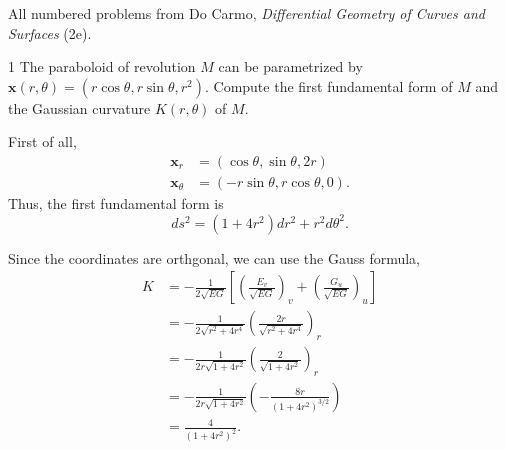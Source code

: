 \documentclass[11pt]{article}
\begin{document}
All numbered problems from Do Carmo, \textit{Differential Geometry of Curves and Surfaces} (2e).
\begin{problem}{1}
  The paraboloid of revolution \( M \) can be parametrized by \( \mathbf{x}(r,\theta) = (r\cos\theta, r\sin\theta, r^2) \).
  Compute the first fundamental form of \( M \) and the Gaussian curvature \( K(r,\theta) \) of \( M \).
\end{problem}
\begin{answer}
  First of all,
  \begin{equation}
  \label{eq:1}
  \begin{aligned}
    \mathbf{x}_r &= (\cos\theta, \sin\theta, 2r) \\
    \mathbf{x}_{\theta} &= (-r\sin\theta, r\cos\theta, 0).
  \end{aligned}
\end{equation}
Thus, the first fundamental form is
\begin{equation}
\label{eq:2}
ds^2 = (1+4r^2)dr^2 + r^2d\theta^2.
\end{equation}

Since the coordinates are orthgonal, we can use the Gauss formula,
\begin{equation}
\label{eq:3}
\begin{aligned}
  K &= - \frac{1}{2 \sqrt{EG}} \left[ \left( \frac{E_v}{\sqrt{EG}} \right)_v + \left( \frac{G_u}{\sqrt{EG}} \right)_u \right] \\
    &= - \frac{1}{2\sqrt{r^2 + 4r^4}} \left( \frac{2r}{\sqrt{r^2 + 4r^{4}}} \right)_{r} \\
    &= - \frac{1}{2r\sqrt{1+4r^2}} \left( \frac{2}{\sqrt{1+4r^2}} \right)_r \\
    &= - \frac{1}{2r\sqrt{1+4r^2}} \left( -\frac{8r}{(1+4r^2)^{3/2}} \right) \\
    &= \frac{4}{(1+4r^2)^2}.
\end{aligned}
\end{equation}
\end{answer}
\end{document}
